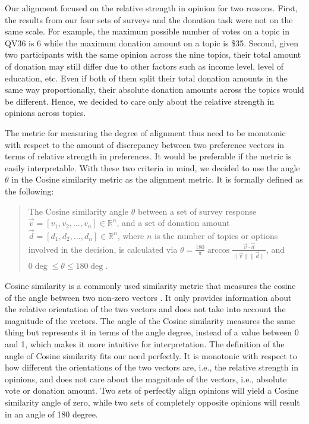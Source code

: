 Our alignment focused on the relative strength in opinion for two reasons. First, the results from our four sets of surveys and the donation task were not on the same scale. For example, the maximum possible number of votes on a topic in QV36 is 6 while the maximum donation amount on a topic is \$35. Second, given two participants with the same opinion across the nine topics, their total amount of donation may still differ due to other factors such as income level, level of education, etc. Even if both of them split their total donation amounts in the same way proportionally, their absolute donation amounts across the topics would be different. Hence, we decided to care only about the relative strength in opinions across topics.

The metric for measuring the degree of alignment thus need to be monotonic with respect to the amount of discrepancy between two preference vectors in terms of relative strength in preferences. It would be preferable if the metric is easily interpretable. With these two criteria in mind, we decided to use the angle $\theta$ in the Cosine similarity metric as the alignment metric. It is formally defined as the following: \\

\begin{quote}
    The Cosine similarity angle $\theta$ between a set of survey response $\vec{v} = [v_1, v_2, ..., v_n] \in \mathbb{R}^n$, and a set of donation amount $\vec{d} = [d_1, d_2, ..., d_n] \in \mathbb{R}^n$, where $n$ is the number of topics or options involved in the decision, is calculated via $\theta = \frac{180}{\pi} \arccos{\frac{\vec{v} \cdot \vec{d}}{\|\vec{v}\| \|\vec{d}\|}}$, and $0\deg \leq \theta \leq 180\deg$.
\end{quote}

Cosine similarity is a commonly used similarity metric that measures the cosine of the angle between two non-zero vectors \cite{singhal2001modern}. It only provides information about the relative orientation of the two vectors and does not take into account the magnitude of the vectors. The angle of the Cosine similarity measures the same thing but represents it in terms of the angle degree, instead of a value between 0 and 1, which makes it more intuitive for interpretation. The definition of the angle of Cosine similarity fits our need perfectly. It is monotonic with respect to how different the orientations of the two vectors are, i.e., the relative strength in opinions, and does not care about the magnitude of the vectors, i.e., absolute vote or donation amount. Two sets of perfectly align opinions will yield a Cosine similarity angle of zero, while two sets of completely opposite opinions will result in an angle of 180 degree.

